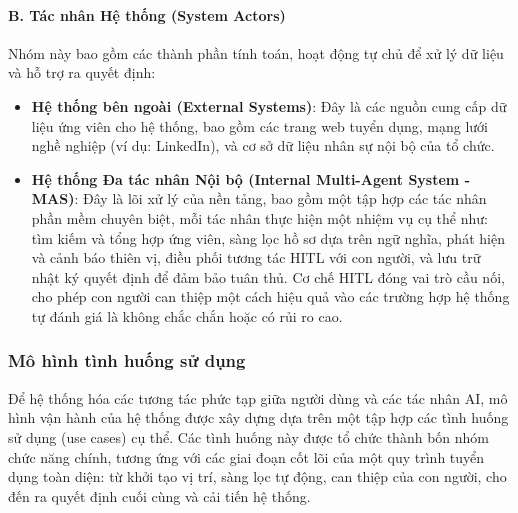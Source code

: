 \documentclass{article}
\begin{document}
\paragraph{B. Tác nhân Hệ thống (System Actors)}
Nhóm này bao gồm các thành phần tính toán, hoạt động tự chủ để xử lý dữ liệu và hỗ trợ ra quyết định:

\begin{itemize}[topsep=0pt, itemsep=4pt, leftmargin=40pt]
    \item \textbf{Hệ thống bên ngoài (External Systems)}: Đây là các nguồn cung cấp dữ liệu ứng viên cho hệ thống, bao gồm các trang web tuyển dụng, mạng lưới nghề nghiệp (ví dụ: LinkedIn), và cơ sở dữ liệu nhân sự nội bộ của tổ chức.
    \item \textbf{Hệ thống Đa tác nhân Nội bộ (Internal Multi-Agent System - MAS)}: Đây là lõi xử lý của nền tảng, bao gồm một tập hợp các tác nhân phần mềm chuyên biệt, mỗi tác nhân thực hiện một nhiệm vụ cụ thể như: tìm kiếm và tổng hợp ứng viên, sàng lọc hồ sơ dựa trên ngữ nghĩa, phát hiện và cảnh báo thiên vị, điều phối tương tác HITL với con người, và lưu trữ nhật ký quyết định để đảm bảo tuân thủ. Cơ chế HITL đóng vai trò cầu nối, cho phép con người can thiệp một cách hiệu quả vào các trường hợp hệ thống tự đánh giá là không chắc chắn hoặc có rủi ro cao.
\end{itemize}

\subsubsection{Mô hình tình huống sử dụng}
Để hệ thống hóa các tương tác phức tạp giữa người dùng và các tác nhân AI, mô hình vận hành của hệ thống được xây dựng dựa trên một tập hợp các tình huống sử dụng (use cases) cụ thể. Các tình huống này được tổ chức thành bốn nhóm chức năng chính, tương ứng với các giai đoạn cốt lõi của một quy trình tuyển dụng toàn diện: từ khởi tạo vị trí, sàng lọc tự động, can thiệp của con người, cho đến ra quyết định cuối cùng và cải tiến hệ thống.
\end{document}
